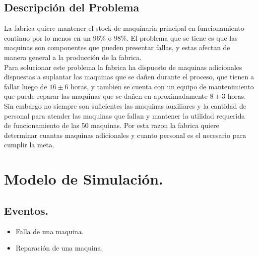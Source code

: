 \documentclass[10pt]{article}
\begin{document}
\subsection{Descripción del Problema}

La fabrica quiere mantener el stock de maquinaria principal en funcionamiento continuo por lo menos en un 96\% o 98\%. El problema que se tiene es que las maquinas son componentes que pueden presentar fallas, y estas afectan de manera general a la producción de la fabrica.\\

Para solucionar este problema la fabrica ha dispuesto de maquinas adicionales dispuestas a suplantar las maquinas que se dañen durante el proceso, que tienen a fallar luego de $16\pm6$ horas, y tambien se cuenta con un equipo de mantenimiento que puede reparar las maquinas que se dañen en aproximadamente $8\pm3$ horas. Sin embargo no siempre son suficientes las maquinas auxiliares y la cantidad de personal para atender las maquinas que fallan y mantener la utilidad requerida de funcionamiento de las 50 maquinas. Por esta razon la fabrica quiere determinar cuantas maquinas adicionales y cuanto personal es el necesario para cumplir la meta.

\section{Modelo de Simulación.}

\subsection{Eventos.}

\begin{itemize}
\item Falla de una maquina.
\item Reparación de una maquina.
\end{itemize}
\end{document}
